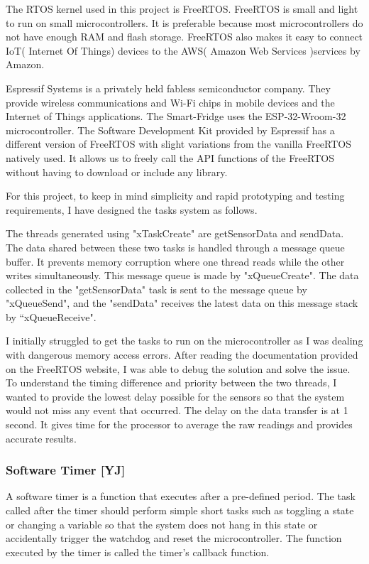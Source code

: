 The RTOS kernel used in this project is FreeRTOS.
FreeRTOS is small and light to run on small microcontrollers.
It is preferable because most microcontrollers do not have enough RAM and flash storage.
FreeRTOS also makes it easy to connect IoT( Internet Of Things) devices to the AWS( Amazon Web Services )services by Amazon.

Espressif Systems is a privately held fabless semiconductor company.
They provide wireless communications and Wi-Fi chips in mobile devices and the Internet of Things applications.
The Smart-Fridge uses the ESP-32-Wroom-32 microcontroller.
The Software Development Kit provided by Espressif has a different version of FreeRTOS with slight variations from the vanilla FreeRTOS natively used.
It allows us to freely call the API functions of the FreeRTOS without having to download or include any library.

For this project, to keep in mind simplicity and rapid prototyping and testing requirements, I have designed the tasks system as follows.

The threads generated using "xTaskCreate" are getSensorData and sendData.
The data shared between these two tasks is handled through a message queue buffer.
It prevents memory corruption where one thread reads while the other writes simultaneously.
This message queue is made by "xQueueCreate".
The data collected in the "getSensorData" task is sent to the message queue by "xQueueSend", and the "sendData" receives the latest data on this message stack by “xQueueReceive".

I initially struggled to get the tasks to run on the microcontroller as I was dealing with dangerous memory access errors.
After reading the documentation provided on the FreeRTOS website, I was able to debug the solution and solve the issue.
To understand the timing difference and priority between the two threads, I wanted to provide the lowest delay possible for the sensors so that the system would not miss any event that occurred.
The delay on the data transfer is at 1 second.
It gives time for the processor to average the raw readings and provides accurate results.

\subsubsection{Software Timer [YJ]}

A software timer is a function that executes after a pre-defined period.
The task called after the timer should perform simple short tasks such as toggling a state or changing a variable so that the system does not hang in this state or accidentally trigger the watchdog and reset the microcontroller.
The function executed by the timer is called the timer's callback function.

